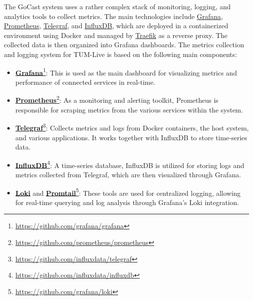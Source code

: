 The GoCast system uses a rather complex stack of monitoring, logging, and analytics tools to collect metrics. The main technologies include \href{https://github.com/grafana/grafana}{Grafana}, \href{https://github.com/prometheus/prometheus}{Prometheus}, \href{https://github.com/influxdata/telegraf}{Telegraf}, and \href{https://github.com/influxdata/influxdb}{InfluxDB}, which are deployed in a containerized environment using Docker and managed by \href{https://github.com/traefik/traefik}{Traefik} as a reverse proxy. The collected data is then organized into Grafana dashboards. The metrics collection and logging system for TUM-Live is based on the following main components:
\begin{itemize}
    \item \textbf{\href{https://github.com/grafana/grafana}{Grafana}}\footnote{\url{https://github.com/grafana/grafana}}: This is used as the main dashboard for visualizing metrics and performance of connected services in real-time.
    \item \textbf{\href{https://github.com/prometheus/prometheus}{Prometheus}}\footnote{\url{https://github.com/prometheus/prometheus}}: As a monitoring and alerting toolkit, Prometheus is responsible for scraping metrics from the various services within the system.
    \item \textbf{\href{https://github.com/influxdata/telegraf}{Telegraf}}\footnote{\url{https://github.com/influxdata/telegraf}}: Collects metrics and logs from Docker containers, the host system, and various applications. It works together with InfluxDB to store time-series data.
    \item \textbf{\href{https://github.com/influxdata/influxdb}{InfluxDB}}\footnote{\url{https://github.com/influxdata/influxdb}}: A time-series database, InfluxDB is utilized for storing logs and metrics collected from Telegraf, which are then visualized through Grafana.
    \item \textbf{\href{https://github.com/grafana/loki}{Loki}} and \textbf{\href{https://grafana.com/docs/loki/latest/send-data/promtail/}{Promtail}}\footnote{\url{https://github.com/grafana/loki}}: These tools are used for centralized logging, allowing for real-time querying and log analysis through Grafana's Loki integration.
\end{itemize}

